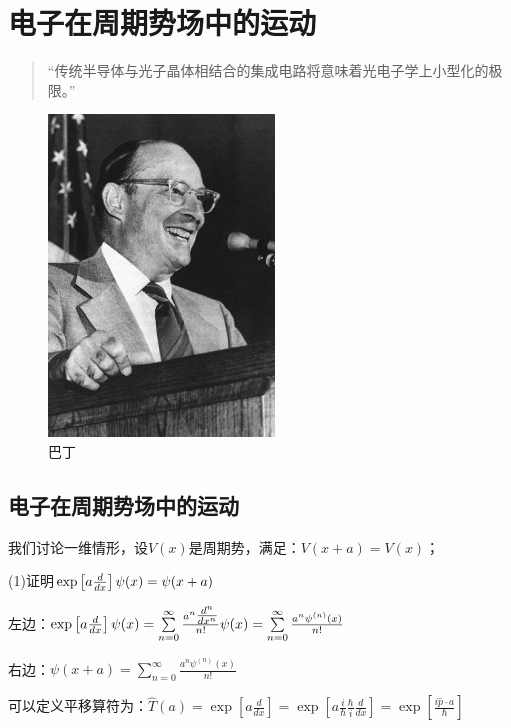 \section{电子在周期势场中的运动}

\begin{quotation}
``传统半导体与光子晶体相结合的集成电路将意味着光电子学上小型化的极限。''
\end{quotation}


\begin{figure}[h]
\begin{center}
\includegraphics[clip,width=6cm]{Symmetry/bardeen.ps}
\caption{巴丁}
\end{center}
\end{figure}


\subsection{电子在周期势场中的运动}


我们讨论一维情形，设$V(x)$是周期势，满足：$V(x + a) = V(x)$；

(1)证明$\exp \left[ {a{\textstyle{d \over {dx}}}} \right]\psi (x) = \psi (x + a)$

左边：$\exp \left[ {a{\textstyle{d \over {dx}}}} \right]\psi (x) = \sum\limits_{n = 0}^\infty  {\frac{{a^n {\textstyle{{d^n } \over {dx^n }}}}}{{n!}}} \psi (x) = \sum\limits_{n = 0}^\infty  {\frac{{a^n \psi ^{(n)} (x)}}{{n!}}} $

右边：$\psi (x + a) = \sum\limits_{n = 0}^\infty  {\frac{{a^n \psi ^{(n)} (x)}}{{n!}}} $

可以定义平移算符为：$\widehat T(a) = \exp \left[ {a\frac{d}{{dx}}} \right] = \exp \left[ {a\frac{i}{\hbar }\frac{\hbar }{i}\frac{d}{{dx}}} \right] = \exp \left[ {\frac{{i\widehat p \cdot a}}{\hbar }} \right]$


